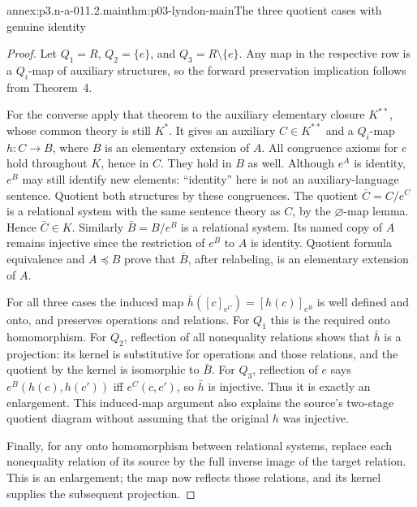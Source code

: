 \begin{annexitem}{annex:p3.n-a-011.2.main}{thm:p03-lyndon-main}{The three quotient cases with genuine identity}
\begin{proof}
Let \(Q_1=R\), \(Q_2=\{e\}\), and \(Q_3=R\setminus\{e\}\).
Any map in the respective row is a \(Q_i\)-map of auxiliary structures,
so the forward preservation implication follows from Theorem~4.

For the converse apply that theorem to the auxiliary elementary closure
\(K^{**}\), whose common theory is still \(K^*\). It gives an
auxiliary \(C\in K^{**}\) and a \(Q_i\)-map
\(h:C\to B\), where \(B\) is an elementary extension of \(A\).
All congruence axioms for \(e\) hold throughout \(K\), hence in \(C\).
They hold in \(B\) as well. Although \(e^A\) is identity,
\(e^B\) may still identify new elements: ``identity'' here is not an
auxiliary-language sentence. Quotient both structures by these congruences.
The quotient \(\bar C=C/e^C\) is a relational system with the same
sentence theory as \(C\), by the \(\varnothing\)-map lemma. Hence
\(\bar C\in K\). Similarly \(\bar B=B/e^B\) is a relational
system. Its named copy of \(A\) remains injective since the restriction
of \(e^B\) to \(A\) is identity. Quotient formula equivalence and
\(A\preccurlyeq B\) prove that \(\bar B\), after relabeling, is
an elementary extension of \(A\).

For all three cases the induced map
\(\bar h([c]_{e^C})=[h(c)]_{e^B}\) is well defined and onto, and
preserves operations and relations. For \(Q_1\) this is the required
onto homomorphism. For \(Q_2\), reflection of all nonequality relations
shows that \(\bar h\) is a projection: its kernel is substitutive
for operations and those relations, and the quotient by the kernel is
isomorphic to \(\bar B\). For \(Q_3\), reflection of \(e\) says
\(e^B(h(c),h(c'))\) iff \(e^C(c,c')\), so \(\bar h\) is
injective. Thus it is exactly an enlargement. This induced-map argument
also explains the source's two-stage quotient diagram without assuming
that the original \(h\) was injective.

Finally, for any onto homomorphism between relational systems, replace
each nonequality relation of its source by the full inverse image of
the target relation. This is an enlargement; the map now reflects those
relations, and its kernel supplies the subsequent projection.
\end{proof}
\end{annexitem}

